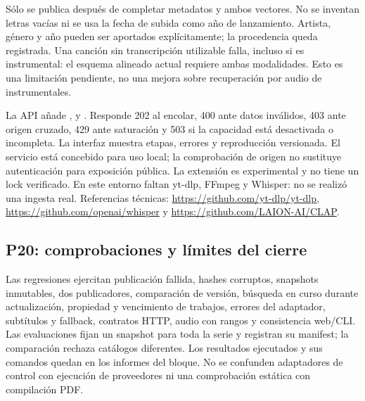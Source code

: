 Sólo se publica después de completar metadatos y ambos vectores. No se inventan
letras vacías ni se usa la fecha de subida como año de lanzamiento. Artista, género
y año pueden ser aportados explícitamente; la procedencia queda registrada. Una
canción sin transcripción utilizable falla, incluso si es instrumental: el esquema
alineado actual requiere ambas modalidades. Esto es una limitación pendiente,
no una mejora sobre recuperación por audio de instrumentales.

La API añade ,  y
. Responde 202 al encolar, 400 ante datos inválidos,
403 ante origen cruzado, 429 ante saturación y 503 si la capacidad está desactivada
o incompleta. La interfaz muestra etapas, errores y reproducción versionada.
El servicio está concebido para uso local; la comprobación de origen no sustituye
autenticación para exposición pública. La extensión
 es experimental y no tiene un lock verificado.
En este entorno faltan yt-dlp, FFmpeg y Whisper: no se realizó una ingesta real.
Referencias técnicas: \url{https://github.com/yt-dlp/yt-dlp},
\url{https://github.com/openai/whisper} y \url{https://github.com/LAION-AI/CLAP}.

\subsection{P20: comprobaciones y límites del cierre}
Las regresiones ejercitan publicación fallida, hashes corruptos, snapshots
inmutables, dos publicadores, comparación de versión, búsqueda en curso durante
actualización, propiedad y vencimiento de trabajos, errores del adaptador,
subtítulos y fallback, contratos HTTP, audio con rangos y consistencia web/CLI.
Las evaluaciones fijan un snapshot para toda la serie y registran su manifest;
la comparación rechaza catálogos diferentes. Los resultados ejecutados y sus
comandos quedan en los informes del bloque. No se confunden adaptadores de
control con ejecución de proveedores ni una comprobación estática con compilación PDF.

